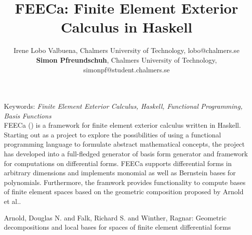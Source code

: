 \documentclass[11pt,a4paper]{article}
\begin{document}
\thispagestyle{empty}

\title{FEECa: Finite Element Exterior Calculus in Haskell}

\author{Irene Lobo Valbuena, Chalmers University of Technology, lobo@chalmers.se \\
        \textbf{Simon Pfreundschuh}, Chalmers University of Technology, simonpf@student.chalmers.se}

\date{} %
\maketitle\thispagestyle{empty}

Keywords: \emph{Finite Element Exterior Calculus, Haskell, Functional Programming,
  Basis Functions}\\


FEECa (\textipa{["fi:ka]}) is a framework for finite element exterior
calculus written in Haskell. Starting out as a project to explore the
possibilities of using a functional programming language to formulate
abstract mathematical concepts, the project has developed into a
full-fledged generator of basis form generator and framework for
computations on differential forms. FEECa supports differential forms
in arbitrary dimensions and implements monomial as well as Bernstein bases
for polynomials. Furthermore, the framwork  provides functionality to
compute bases of finite element spaces based on the geometric composition
proposed by Arnold et al.\cite{arnold}.

\begin{thebibliography}{00}
 Arnold, Douglas N. and Falk, Richard S. and Winther, Ragnar:
 Geometric decompositions and local bases for spaces of finite element differential forms
\end{thebibliography}
\end{document}
